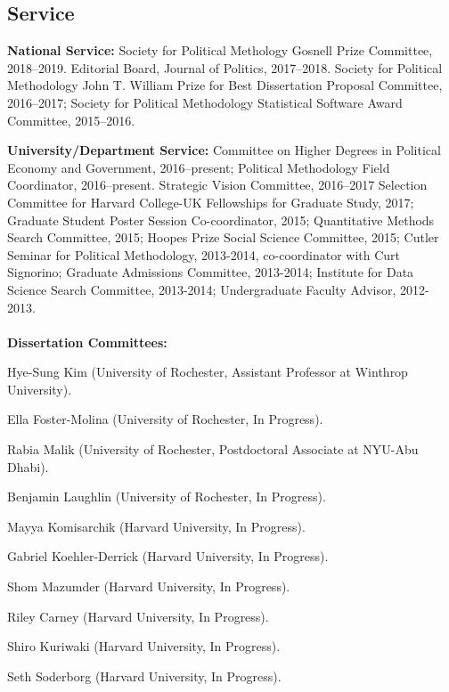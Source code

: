 \documentclass[margin,line,12pt]{res}
\newenvironment{list1}{
  \begin{list}{\ding{113}}{%
      \setlength{\itemsep}{0in}
      \setlength{\parsep}{0in} \setlength{\parskip}{0in}
      \setlength{\topsep}{0in} \setlength{\partopsep}{0in} 
      \setlength{\leftmargin}{0.83 cm}}}{\end{list}}
\begin{document}
\begin{resume}
\section{\sc Service}

\textbf{National Service:} Society for Political Methology Gosnell Prize Committee, 2018--2019. Editorial Board, Journal of Politics, 2017--2018.  Society for Political Methodology John T. William Prize for Best Dissertation Proposal Committee, 2016--2017; Society for Political Methodology Statistical Software Award Committee, 2015--2016.

\textbf{University/Department Service:} Committee on Higher Degrees in Political Economy and Government, 2016--present; Political Methodology Field Coordinator, 2016--present. Strategic Vision Committee, 2016--2017 Selection Committee for Harvard College-UK Fellowships for Graduate Study, 2017; Graduate Student Poster Session Co-coordinator, 2015; Quantitative Methods Search Committee, 2015; Hoopes Prize Social Science Committee, 2015; Cutler Seminar for Political Methodology, 2013-2014, co-coordinator with Curt Signorino; Graduate Admissions Committee, 2013-2014; Institute for Data Science Search Committee, 2013-2014; Undergraduate Faculty Advisor, 2012-2013. \\ 
\\
\textbf{Dissertation Committees:}
\begin{list1}
\item[] Hye-Sung Kim (University of Rochester, Assistant Professor at Winthrop University).
\item[] Ella Foster-Molina (University of Rochester, In Progress).
\item[] Rabia Malik (University of Rochester, Postdoctoral Associate at NYU-Abu Dhabi).
\item[] Benjamin Laughlin (University of Rochester, In Progress).
\item[] Mayya Komisarchik (Harvard University, In Progress).
\item[] Gabriel Koehler-Derrick (Harvard University, In Progress).
\item[] Shom Mazumder (Harvard University, In Progress).
\item[] Riley Carney (Harvard University, In Progress).
\item[] Shiro Kuriwaki (Harvard University, In Progress).
\item[] Seth Soderborg (Harvard University, In Progress).
\end{list1}


\end{resume}
\end{document}
